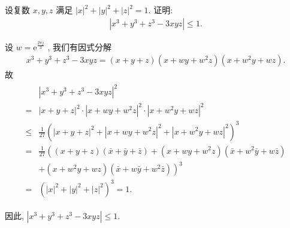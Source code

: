 \begin{example}
	设复数 $x ,  y ,  z$ 满足 $|x|^2+|y|^2+|z|^2=1$. 证明:
	\begin{align*}
		\left|x^3+y^3+z^3-3 x y z\right| \leqslant 1 .
	\end{align*}
\end{example}
\begin{solution}
	设 $w=\mathrm{e}^{\frac{2 \pi j}{3}}$ , 我们有因式分解
	\begin{align*}
		x^3+y^3+z^3-3 x y z=(x+y+z)\left(x+w y+w^2 z\right)\left(x+w^2 y+w z\right) .
	\end{align*}
	故
	\begin{align*}
		\begin{aligned}
			          & \left|x^3+y^3+z^3-3 x y z\right|^2                                                                                           \\
			=         & |x+y+z|^2 \cdot\left|x+w y+w^2 z\right|^2 \cdot\left|x+w^2 y+w z\right|^2                                                    \\
			\leqslant & \frac{1}{27}\left(|x+y+z|^2+\left|x+w y+w^2 z\right|^2+\left|x+w^2 y+w z\right|^2\right)^3                                   \\
			=         & \frac{1}{27}\left((x+y+z)(\bar{x}+\bar{y}+\bar{z})+\left(x+w y+w^2 z\right)\left(\bar{x}+w^2 \bar{y}+w \bar{z}\right)\right. \\
			          & \left.+\left(x+w^2 y+w z\right)\left(\bar{x}+w \bar{y}+w^2 \bar{z}\right)\right)^3                                           \\
			=         & \left(|x|^2+|y|^2+|z|^2\right)^3=1 .
		\end{aligned}
	\end{align*}

	因此, $\left|x^3+y^3+z^3-3 x y z\right| \leqslant 1$.
\end{solution}


